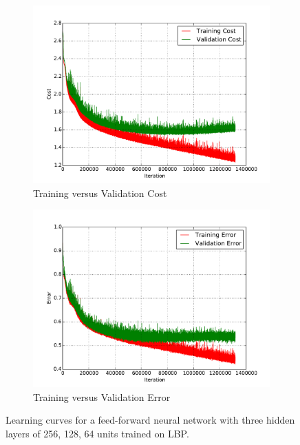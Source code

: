 \begin{figure}[H]
	\centering
	\begin{subfigure}[b]{0.45\linewidth}
		\centering
		\includegraphics[width=\linewidth]{images/2/train_val_cost.pdf}
		\caption{Training versus Validation Cost}
	\end{subfigure}
	\hfill
	\begin{subfigure}[b]{0.45\linewidth}
		\centering
		\includegraphics[width=\linewidth]{images/2/train_val_error.pdf}
		\caption{Training versus Validation Error}
	\end{subfigure}
	\caption{Learning curves for a feed-forward neural network with three hidden layers of 256, 128, 64 units trained on LBP.} 
	\label{shrine2_curves}
\end{figure}
